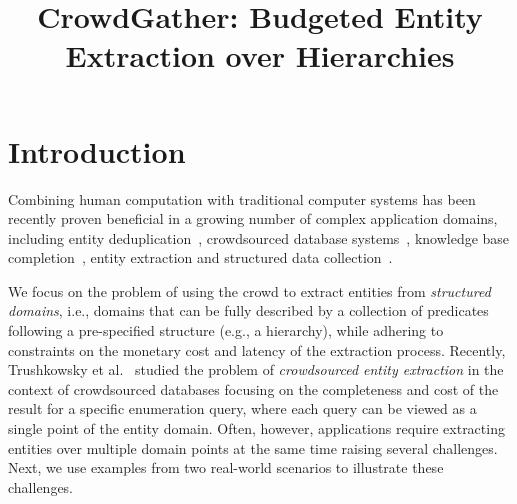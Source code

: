 \documentclass{vldb}
\begin{document}

\title{CrowdGather: Budgeted Entity Extraction over Hierarchies}


\author{
}

\maketitle

\begin{abstract}

\end{abstract}




\section{Introduction}
Combining human computation with traditional computer systems has been recently proven beneficial in a growing number of complex application domains, including entity deduplication~\cite{wang:2012}, crowdsourced database systems~\cite{franklin:2011, marcus:2011}, knowledge base completion~\cite{kondredi:2014, west:2014}, entity extraction and structured data collection~\cite{trushkowsky:2013, park:2014}. 

We focus on the problem of using the crowd to extract entities from {\em structured domains}, i.e., domains that can be fully described by a collection of predicates following a pre-specified structure (e.g., a hierarchy), while adhering to constraints on the monetary cost and latency of the extraction process. Recently, Trushkowsky et al.~\cite{trushkowsky:2013} studied the problem of {\em crowdsourced entity extraction} in the context of crowdsourced databases focusing on the completeness and cost of the result for a specific enumeration query, where each query can be viewed as a single point of the entity domain. 
Often, however, applications require extracting entities over multiple domain points at the same time raising several challenges. Next, we use examples from two real-world scenarios to illustrate these challenges. 



\end{document}
